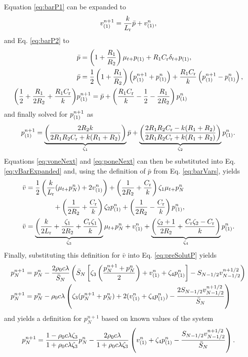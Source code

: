{Equation \eqref{eq:barP1} can be expanded to 
\begin{equation}\label{eq:voneNext}
    v_{(1)}^{n+1} = \frac{k}{L_{\text{r}}}\bar p + v_{(1)}^n ,
\end{equation}
and Eq. \eqref{eq:barP2} to 
\begin{align*}
    &\bar p =\left(1+\frac{R_1}{R_2}\right)\mu_{t+}p_{(1)}+ R_1 C_{\text{r}}\delta_{t+}p_{(1)},\\
    &\bar p =\frac{1}{2}\left(1+\frac{R_1}{R_2}\right)\left(p_{(1)}^{n+1} + p_{(1)}^n\right) + \frac{R_1C_{\text{r}}}{k}\left(p_{(1)}^{n+1} - p_{(1)}^n\right),\\
    \left(\frac{1}{2}+\frac{R_1}{2R_2} + \frac{R_1C_{\text{r}}}{k}\right)&p_{(1)}^{n+1} = \bar p + \left(\frac{R_1C_{\text{r}}}{k} - \frac{1}{2} - \frac{R_1}{2R_2}\right)p_{(1)}^n
\end{align*}
and finally solved for $p_{(1)}^{n+1}$ as
\begin{equation}\label{eq:poneNext}
    p_{(1)}^{n+1} = \underbrace{\left(\frac{2R_2k}{2R_1R_2C_{\text{r}} + k(R_1 + R_2)}\right)}_{\zeta_1}\bar p + \underbrace{\left(\frac{2R_1R_2C_{\text{r}} - k(R_1 + R_2)}{2R_1R_2C_{\text{r}} + k(R_1 + R_2)}\right)}_{\zeta_2} p_{(1)}^n .
\end{equation}
Equations \eqref{eq:voneNext} and \eqref{eq:poneNext} can then be substituted into Eq. \eqref{eq:vBarExpanded} and, using the definition of $\bar p$ from Eq. \eqref{eq:barVars}, yields
\begin{align}
    \bar v &= \frac{1}{2}\left(\frac{k}{L_{\text{r}}}(\mu_{t+}p_N^n) + 2v_{(1)}^n\right)+\left(\frac{1}{2R_2} + \frac{C_{\text{r}}}{k}\right)\zeta_1\mu_{t+}p_N^n\nonumber \\
    & \qquad\qquad+ \left(\frac{1}{2R_2} + \frac{C_{\text{r}}}{k}\right)\zeta_2p_{(1)}^n + \left(\frac{1}{2R_2} - \frac{C_{\text{r}}}{k}\right)p_{(1)}^n\nonumber,\\
    \bar v &= \underbrace{\left(\frac{k}{2L_{\text{r}}} + \frac{\zeta_1}{2R_2}+\frac{C_{\text{r}}\zeta_1}{k}\right)}_{\zeta_3}\mu_{t+}p_N^n + v_{(1)}^n + \underbrace{\left(\frac{\zeta_2+1}{2R_2} + \frac{C_{\text{r}}\zeta_2 - C_{\text{r}}}{k}\right)}_{\zeta_4}p_{(1)}^n.
\end{align}
Finally, substituting this definition for $\bar v$ into Eq. \eqref{eq:preSolutP} yields
\begin{align}
    p_N^{n+1} &= p_N^n - \frac{2\rho_0c\lambda}{\bar S_N}\left(\bar S_N
    \left[\zeta_3\left(\frac{p_N^{n+1} + p_N^n}{2}\right) + v_{(1)}^n + \zeta_4p_{(1)}^n\right] - S_{N-1/2}v_{N-1/2}^{n+1/2}\right)\nonumber\\
    p_N^{n+1} &= p_N^n - \rho_0c\lambda\left(\zeta_3(p_N^{n+1} + p_N^n) + 2(v_{(1)}^n + \zeta_4p_{(1)}^n)-\frac{2S_{N-1/2}v_{N-1/2}^{n+1/2}}{\bar S_N}\right)\nonumber
\end{align}
and yields a definition for $p_N^{n+1}$ based on known values of the system 
\begin{equation}
    p_N^{n+1} = \frac{1 - \rho_0c\lambda\zeta_3}{1+\rho_0c\lambda\zeta_3}p_N^n - \frac{2\rho_0c\lambda}{1+\rho_0c\lambda\zeta_3} \left( v_{(1)}^n+\zeta_4p_{(1)}^n - \frac{S_{N-1/2}v_{N-1/2}^{n+1/2}}{\bar S_N}\right).
\end{equation}
}
